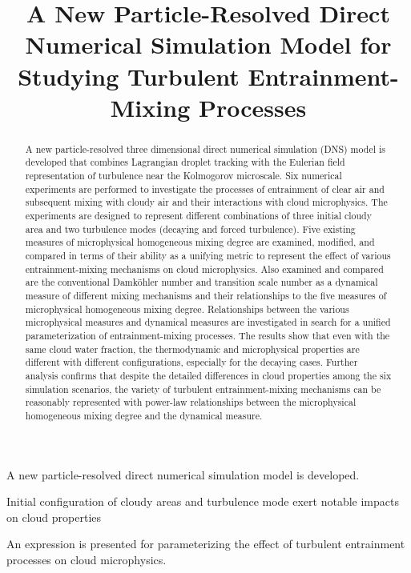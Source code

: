 \documentclass[draft,linenumbers]{agujournal}
\begin{document}
\title{A New Particle-Resolved Direct Numerical Simulation Model for Studying Turbulent Entrainment-Mixing Processes}



\begin{keypoints}
\item A new particle-resolved direct numerical simulation model is developed.
\item Initial configuration of cloudy areas and turbulence mode exert notable impacts on cloud properties
\item An expression is presented for parameterizing the effect of turbulent entrainment processes on cloud microphysics.
\end{keypoints}

\begin{abstract}
A new particle-resolved three dimensional direct numerical simulation (DNS) model is developed that combines Lagrangian droplet tracking with the Eulerian field representation of turbulence near the Kolmogorov microscale. Six numerical experiments are performed to investigate the processes of entrainment of clear air and subsequent mixing with cloudy air and their interactions with cloud microphysics. The experiments are designed to represent different combinations of three initial cloudy area and two turbulence modes (decaying and forced turbulence). Five existing measures of microphysical homogeneous mixing degree are examined, modified, and compared in terms of their ability as a unifying metric to represent the effect of various entrainment-mixing mechanisms on cloud microphysics. Also examined and compared are the conventional Damk\"ohler number and transition scale number as a dynamical measure of different mixing mechanisms and their relationships to the five measures of microphysical homogeneous mixing degree. Relationships between the various microphysical measures and dynamical measures are investigated in search for a unified parameterization of entrainment-mixing processes. The results show that even with the same cloud water fraction, the thermodynamic and microphysical properties are different with different configurations, especially for the decaying cases. Further analysis confirms that despite the detailed differences in cloud properties among the six simulation scenarios, the variety of turbulent entrainment-mixing mechanisms can be reasonably represented with power-law relationships between the microphysical homogeneous mixing degree and the dynamical measure.    
\end{abstract}
\end{document}
